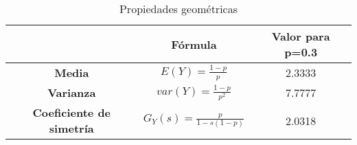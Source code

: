 
\begin{table}[H]
\begin{center}
\begin{tabular}{|c|c|c|}
\hline
   \rowcolor[RGB]{0,88,147}    & \textbf{F\'ormula}              & \textbf{Valor para p=0.3} \\ \hline
\textbf{Media} &$E(Y)=\frac{1-p}{p}$ & 2.3333\\ \hline
\textbf{Varianza} & $var(Y)=\frac{1-p}{p^2}$ &7.7777\\ \hline
\textbf{Coeficiente de simetr\'ia} & $G_Y(s)=\frac{p}{1-s(1-p)}$ & 2.0318 \\
\hline
\end{tabular}
\end{center}
\caption{Propiedades geom\'etricas}
\label{tabla}
\end{table}

